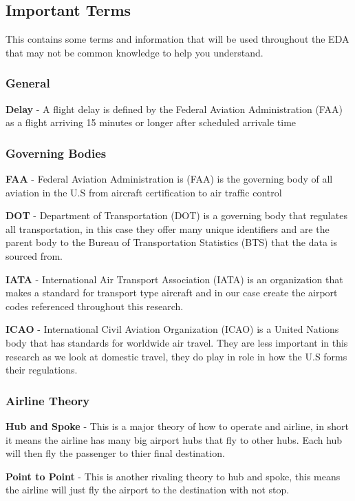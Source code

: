 \documentclass[a4paper,12pt]{article}
\begin{document}
\pagebreak

\subsection{Important Terms}
This contains some terms and information that will be used throughout the EDA that may not be common knowledge to help you understand. 

\subsubsection{General}

\textbf{Delay} - A flight delay is defined by the Federal Aviation Administration (FAA) as a flight arriving 15 minutes or longer after scheduled arrivale time

\subsubsection{Governing Bodies}
\textbf{FAA} - Federal Aviation Administration is (FAA) is the governing body of all aviation in the U.S from aircraft certification to air traffic control

\textbf{DOT} - Department of Transportation (DOT) is a governing body that regulates all transportation, in this case they offer many unique identifiers 
and are the parent body to the Bureau of Transportation Statistics (BTS) that the data is sourced from.

\textbf{IATA} - International Air Transport Association (IATA) is an organization that makes a standard for transport type aircraft and in our case create the airport codes referenced
throughout this research. 

\textbf{ICAO} - International Civil Aviation Organization (ICAO) is a United Nations body that has standards for worldwide air travel. They are less important in this research as we look at domestic travel,
they do play in role in how the U.S forms their regulations.

\subsubsection{Airline Theory}

\textbf{Hub and Spoke} - This is a major theory of how to operate and airline, in short it means the airline has many big airport hubs that fly to other hubs.
Each hub will then fly the passenger to thier final destination.

\textbf{Point to Point} - This is another rivaling theory to hub and spoke, this means the airline will just fly the airport to the destination with not stop.
\end{document}
